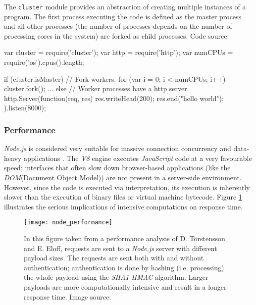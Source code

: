 \begin{program}
  \caption{The \texttt{cluster} module provides an abstraction of creating multiple instances of a program. The first process executing the code is defined as the master process and all other processes (the number of processes depends on the number of processing cores in the system) are forked as child processes. Code source: \cite{Hughes-Croucher2012}}
  \label{prog:cluster}
  \begin{JavaCode}
var cluster = require('cluster'); 
var http = require('http');
var numCPUs = require('os').cpus().length;

if (cluster.isMaster) {
    // Fork workers.
    for (var i = 0; i < numCPUs; i++) {
        cluster.fork();
    }
    ...
} else {
    // Worker processes have a http server.
    http.Server(function(req, res) {
        res.writeHead(200);
        res.end("hello world\n");
    }).listen(8000);
}
  \end{JavaCode}
\end{program}

\subsubsection*{Performance}
\textit{Node.js} is considered very suitable for massive connection concurrency and data-heavy applications \cite[p. 44]{Torstensson2012}. The \textit{V8} engine executes \textit{JavaScript} code at a very favourable speed; interfaces that often slow down browser-based applications (like the \textit{DOM}(Document Object Model)) are not present in a server-side environment. However, since the code is executed via interpretation, its execution is inherently slower than the execution of binary files or virtual machine bytecode. Figure \ref{fig:node_performance} illustrates the serious implications of intensive computations on response time. 

\begin{figure}
\centering\small
\setlength{\tabcolsep}{0mm}
  \texttt{[image: node\_performance]}
\caption{
In this figure taken from a performance analysis of D. Torstensson and E. Eloff, requests are sent to a \textit{Node.js} server with different payload sizes. The requests are sent both with and without authentication; authentication is done by hashing (i.e. processing) the whole payload using the \textit{SHA1-HMAC} algorithm. Larger payloads are more computationally intensive and result in a longer response time. Image source: \cite{Torstensson2012}
}
\label{fig:node_performance}
\end{figure}

